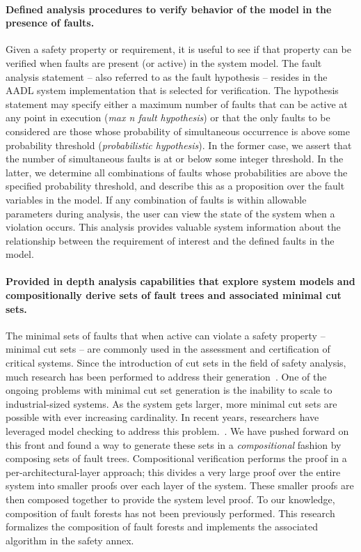 \paragraph{Defined analysis procedures to verify behavior of the model in the presence of faults.}
Given a safety property or requirement, it is useful to see if that property can be verified when faults are present (or active) in the system model. The fault analysis statement -- also referred to as the fault hypothesis -- resides in the AADL system implementation that is selected for verification. The hypothesis statement may specify either a maximum number of faults that can be active at any point in execution (\emph{max n fault hypothesis}) or that the only faults to be considered are those whose probability of simultaneous occurrence is above some probability threshold (\emph{probabilistic hypothesis}).  In the former case, we assert that the number of simultaneous faults is at or below some integer threshold.  In the latter, we determine all combinations of faults whose probabilities are above the specified probability threshold, and describe this as a proposition over the fault variables in the model. If any combination of faults is within allowable parameters during analysis, the user can view the state of the system when a violation occurs. This analysis provides valuable system information about the relationship between the requirement of interest and the defined faults in the model. 

\paragraph{Provided in depth analysis capabilities that explore system models and compositionally derive sets of fault trees and associated minimal cut sets.}
The minimal sets of faults that when active can violate a safety property -- minimal cut sets -- are commonly used in the assessment and certification of critical systems. Since the introduction of cut sets in the field of safety analysis, much research has been performed to address their generation~\cite{fta:survey,rauzy1993new,historyFTA,Bozzano:2010:DSA:1951720,rausand2003system}. One of the ongoing problems with minimal cut set generation is the inability to scale to industrial-sized systems. As the system gets larger, more minimal cut sets are possible with ever increasing cardinality. In recent years, researchers have leveraged model checking to address this problem.~\cite{bieber2002combination,schafer2003combining,fta:survey,contractBasedDesign,symbFTA,DBLP:conf/cav/BozzanoCPJKPRT15}. We have pushed forward on this front and found a way to generate these sets in a \emph{compositional} fashion by composing sets of fault trees. Compositional verification performs the proof in a per-architectural-layer approach; this divides a very large proof over the entire system into smaller proofs over each layer of the system. These smaller proofs are then composed together to provide the system level proof. To our knowledge, composition of fault forests has not been previously performed. This research formalizes the composition of fault forests and implements the associated algorithm in the safety annex.

